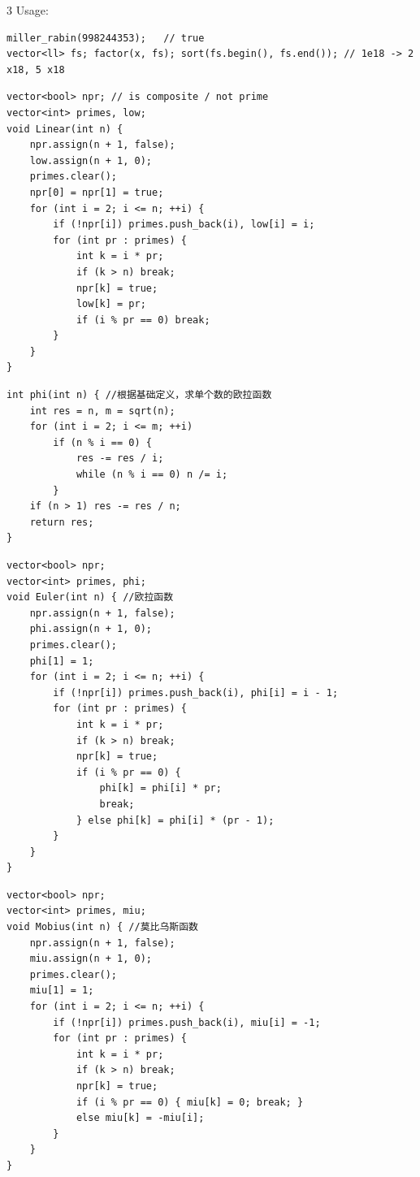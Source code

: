 \documentclass[8pt]{extarticle}
\begin{document}
\begin{multicols*}{3}
Usage:

\begin{lstlisting}
miller_rabin(998244353);   // true
vector<ll> fs; factor(x, fs); sort(fs.begin(), fs.end()); // 1e18 -> 2 x18, 5 x18
\end{lstlisting}

\begin{lstlisting}
vector<bool> npr; // is composite / not prime
vector<int> primes, low;
void Linear(int n) {
    npr.assign(n + 1, false);
    low.assign(n + 1, 0);
    primes.clear();
    npr[0] = npr[1] = true;
    for (int i = 2; i <= n; ++i) {
        if (!npr[i]) primes.push_back(i), low[i] = i;
        for (int pr : primes) {
            int k = i * pr;
            if (k > n) break;
            npr[k] = true;
            low[k] = pr;
            if (i % pr == 0) break;
        }
    }
}
\end{lstlisting}

\begin{lstlisting}
int phi(int n) { //根据基础定义，求单个数的欧拉函数
    int res = n, m = sqrt(n);
    for (int i = 2; i <= m; ++i)
        if (n % i == 0) {
            res -= res / i;
            while (n % i == 0) n /= i;
        }
    if (n > 1) res -= res / n;
    return res;
}
\end{lstlisting}

\begin{lstlisting}
vector<bool> npr;
vector<int> primes, phi;
void Euler(int n) { //欧拉函数
    npr.assign(n + 1, false);
    phi.assign(n + 1, 0);
    primes.clear();
    phi[1] = 1;
    for (int i = 2; i <= n; ++i) {
        if (!npr[i]) primes.push_back(i), phi[i] = i - 1;
        for (int pr : primes) {
            int k = i * pr;
            if (k > n) break;
            npr[k] = true;
            if (i % pr == 0) { 
                phi[k] = phi[i] * pr;
                break;
            } else phi[k] = phi[i] * (pr - 1);
        }
    }
}
\end{lstlisting}

\begin{lstlisting}
vector<bool> npr;
vector<int> primes, miu;
void Mobius(int n) { //莫比乌斯函数
    npr.assign(n + 1, false);
    miu.assign(n + 1, 0);
    primes.clear();
    miu[1] = 1;
    for (int i = 2; i <= n; ++i) {
        if (!npr[i]) primes.push_back(i), miu[i] = -1;
        for (int pr : primes) {
            int k = i * pr;
            if (k > n) break;
            npr[k] = true;
            if (i % pr == 0) { miu[k] = 0; break; }
            else miu[k] = -miu[i];
        }
    }
}
\end{lstlisting}


\end{multicols*}
\end{document}
